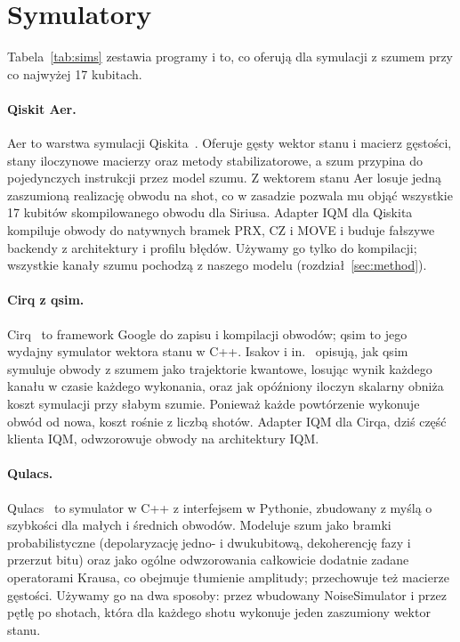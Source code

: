 \documentclass{scspaperproc}
\begin{document}
\section{Symulatory}

Tabela~\ref{tab:sims} zestawia programy i to, co oferują dla symulacji
z szumem przy co najwyżej 17 kubitach.

\paragraph{Qiskit Aer.}
Aer to warstwa symulacji Qiskita~\cite{javadi2024}. Oferuje gęsty wektor
stanu i macierz gęstości, stany iloczynowe macierzy oraz metody
stabilizatorowe, a szum przypina do pojedynczych instrukcji przez model
szumu. Z wektorem stanu Aer losuje jedną zaszumioną realizację obwodu na shot, co w zasadzie pozwala mu objąć wszystkie 17 kubitów skompilowanego obwodu dla Siriusa.
Adapter IQM dla Qiskita~\cite{iqmclient} kompiluje obwody do natywnych bramek
PRX, CZ i MOVE i buduje fałszywe backendy z architektury i profilu błędów.
Używamy go tylko do kompilacji; wszystkie kanały szumu pochodzą z naszego
modelu (rozdział~\ref{sec:method}).

\paragraph{Cirq z qsim.}
Cirq~\cite{cirq} to framework Google do zapisu i kompilacji obwodów; qsim to
jego wydajny symulator wektora stanu w C++. Isakov i in.~\cite{isakov2021qsim}
opisują, jak qsim symuluje obwody z szumem jako trajektorie kwantowe, losując
wynik każdego kanału w czasie każdego wykonania, oraz jak opóźniony iloczyn
skalarny obniża koszt symulacji przy słabym szumie. Ponieważ każde powtórzenie wykonuje obwód od nowa, koszt rośnie z liczbą
shotów. Adapter IQM dla Cirqa, dziś
część klienta IQM, odwzorowuje obwody na architektury IQM.

\paragraph{Qulacs.}
Qulacs~\cite{suzuki2021qulacs} to symulator w C++ z interfejsem w Pythonie,
zbudowany z myślą o szybkości dla małych i średnich obwodów. Modeluje szum
jako bramki probabilistyczne (depolaryzację jedno- i dwukubitową, dekoherencję
fazy i przerzut bitu) oraz jako ogólne odwzorowania całkowicie dodatnie zadane
operatorami Krausa, co obejmuje tłumienie amplitudy; przechowuje też macierze
gęstości. Używamy go na dwa sposoby: przez wbudowany NoiseSimulator i przez
pętlę po shotach, która dla każdego shotu wykonuje jeden zaszumiony wektor
stanu.
\end{document}
